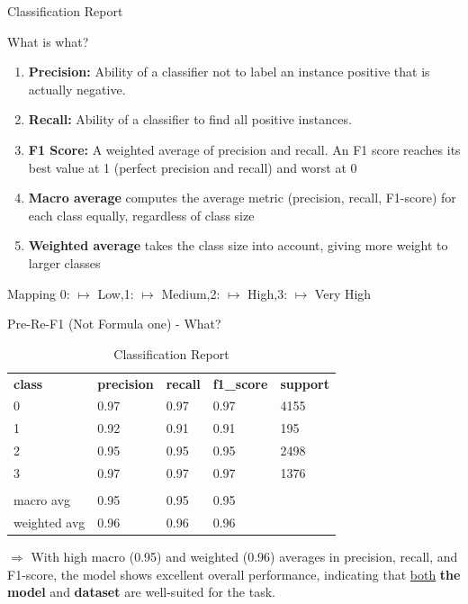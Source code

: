 \documentclass[xetex,notheorems,hyperref={pdfpagelabels=true},xcolor=table]{beamer}
\theoremstyle{plain}
\theoremstyle{definition}
\theoremstyle{example}
\theoremstyle{example}
\begin{document}
\begin{frame}{Classification Report}

    \begin{block}{What is what?}
        \begin{enumerate}[\indent$\square$]
            \item \textbf{Precision:} Ability of a classifier not to label an instance positive that is actually negative.
            \item \textbf{Recall:} Ability of a classifier to find all positive instances.
            \item \textbf{F1 Score:} A weighted average of precision and recall. An F1 score reaches its best value at 1 (perfect precision and recall) and worst at 0
            \item \textbf{Macro average} computes the average metric (precision, recall, F1-score) for each class equally, regardless of class size 
            \item \textbf{Weighted average} takes the class size into account, giving more weight to larger classes
        \end{enumerate}
    \end{block}
Mapping 0: $\mapsto$ Low,\hfill 1: $\mapsto$ Medium,\hfill 2: $\mapsto$ High,\hfill 3: $\mapsto$ Very High   
\end{frame}
\begin{frame}{Pre-Re-F1 (Not Formula one) - What?}
\begin{table}
\caption{Classification Report}
\begin{tabular}{p{2cm} p{1.5cm} p{1.5cm} p{1.5cm} p{1.5cm}}
\hline 
\textbf{class} & \textbf{precision} & \textbf{recall} & \textbf{f1\_score} & \textbf{support} \\
0 & 0.97 & 0.97	& 0.97 & 4155 \\
1 & 0.92 & 0.91	& 0.91 & 195 \\
2 & 0.95 & 0.95	& 0.95 & 2498 \\
3 & 0.97 & 0.97	& 0.97 & 1376 \\
\\
macro avg & 0.95 & 0.95 & 0.95\\
weighted avg & 0.96 & 0.96 & 0.96 \\
\hline 
\end{tabular}
\end{table}
    $\Rightarrow$ With high macro (0.95) and weighted (0.96) averages in precision, recall, and F1-score, the model shows excellent overall performance, indicating that \underline{both} \textbf{the model} and \textbf{dataset} are well-suited for the task.
    \end{frame}
\end{document}
